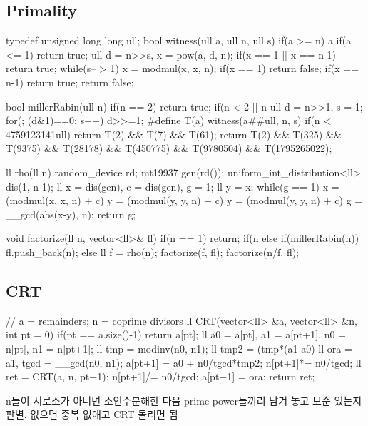 \subsection{Primality}
\begin{cpp}
typedef unsigned long long ull;
bool witness(ull a, ull n, ull s){
  if(a >= n) a%
  if(a <= 1) return true;
  ull d = n>>s, x = pow(a, d, n);
  if(x == 1 || x == n-1) return true;
  while(s-- > 1){
    x = modmul(x, x, n);
    if(x == 1) return false;
    if(x == n-1) return true;
  }
  return false;
}

bool millerRabin(ull n){
  if(n == 2) return true;
  if(n < 2 || n%
  ull d = n>>1, s = 1;
  for(; (d&1)==0; s++) d>>=1;
#define T(a) witness(a##ull, n, s)
  if(n < 4759123141ull) return T(2) && T(7) && T(61);
  return T(2) && T(325) && T(9375) && T(28178)
    && T(450775) && T(9780504) && T(1795265022);
}

ll rho(ll n){
  random_device rd; mt19937 gen(rd());
  uniform_int_distribution<ll> dis(1, n-1);
  ll x = dis(gen), c = dis(gen), g = 1; ll y = x;
  while(g == 1){
    x = (modmul(x, x, n) + c) %
    y = (modmul(y, y, n) + c) %
    y = (modmul(y, y, n) + c) %
    g = __gcd(abs(x-y), n);
  }
  return g;
}

void factorize(ll n, vector<ll>& fl){
  if(n == 1) return;
  if(n%
  else if(millerRabin(n)) fl.push_back(n);
  else{
    ll f = rho(n);
    factorize(f, fl); factorize(n/f, fl);
  }
}
\end{cpp}

\subsection{CRT}
\begin{cpp}
// a = remainders; n = coprime divisors
ll CRT(vector<ll> &a, vector<ll> &n, int pt = 0){
    if(pt == a.size()-1) return a[pt];
    ll a0 = a[pt], a1 = a[pt+1], n0 = n[pt], n1 = n[pt+1];
    ll tmp = modinv(n0, n1);
    ll tmp2 = (tmp*(a1-a0) %
    ll ora = a1, tgcd = __gcd(n0, n1);
    a[pt+1] = a0 + n0/tgcd*tmp2;
    n[pt+1]*= n0/tgcd;
    ll ret = CRT(a, n, pt+1);
    n[pt+1]/= n0/tgcd;
    a[pt+1] = ora;
    return ret;
}
\end{cpp}

n들이 서로소가 아니면 소인수분해한 다음 prime power들끼리 남겨 놓고 모순 있는지 판별, 없으면 중복 없애고 CRT 돌리면 됨

